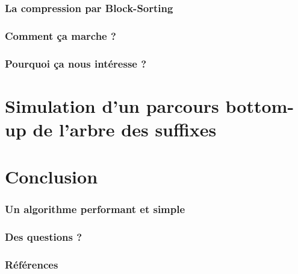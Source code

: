 \documentclass[10pt]{beamer}
\begin{document}
\begin{frame}
  \frametitle{La compression par Block-Sorting}
\end{frame}

\begin{frame}
  \frametitle{Comment ça marche ?}
\end{frame}

\begin{frame}
  \frametitle{Pourquoi ça nous intéresse ?}
\end{frame}



\section{Simulation d'un parcours bottom-up de l'arbre des suffixes}
\label{sec:appbottomup}


\section{Conclusion}
\label{sec:conclusion}

\begin{frame}
  \frametitle{Un algorithme performant et simple}
\end{frame}

\begin{frame}
  \frametitle{Des questions ?}
\end{frame}

\begin{frame}
  \frametitle{Références}
  
  
\end{frame}
\end{document}
